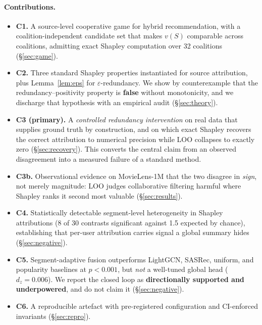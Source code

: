\documentclass[11pt]{article}
\begin{document}
\paragraph{Contributions.}
\begin{itemize}
\item \textbf{C1.} A source-level cooperative game for hybrid recommendation,
      with a coalition-independent candidate set that makes $v(S)$ comparable
      across coalitions, admitting exact Shapley computation over 32
      coalitions (\S\ref{sec:game}).
\item \textbf{C2.} Three standard Shapley properties instantiated for source
      attribution, plus Lemma~\ref{lem:eps} for $\varepsilon$-redundancy. We
      show by counterexample that the redundancy--positivity property is
      \textbf{false} without monotonicity, and we discharge that hypothesis
      with an empirical audit (\S\ref{sec:theory}).
\item \textbf{C3 (primary).} A \emph{controlled redundancy intervention} on
      real data that supplies ground truth by construction, and on which exact
      Shapley recovers the correct attribution to numerical precision while LOO
      collapses to exactly zero (\S\ref{sec:recovery}). This converts the
      central claim from an observed disagreement into a measured failure of a
      standard method.
\item \textbf{C3b.} Observational evidence on MovieLens-1M that the two
      disagree in \emph{sign}, not merely magnitude: LOO judges collaborative
      filtering harmful where Shapley ranks it second most valuable
      (\S\ref{sec:results}).
\item \textbf{C4.} Statistically detectable segment-level heterogeneity in
      Shapley attributions (8 of 30 contrasts significant against 1.5 expected
      by chance), establishing that per-user attribution carries signal a
      global summary hides (\S\ref{sec:negative}).
\item \textbf{C5.} Segment-adaptive fusion outperforms LightGCN, SASRec,
      uniform, and popularity baselines at $p < 0.001$, but \emph{not} a
      well-tuned global head ($d_z = 0.006$). We report the closed loop as
      \textbf{directionally supported and underpowered}, and do not claim it
      (\S\ref{sec:negative}).
\item \textbf{C6.} A reproducible artefact with pre-registered configuration
      and CI-enforced invariants (\S\ref{sec:repro}).
\end{itemize}
\end{document}
